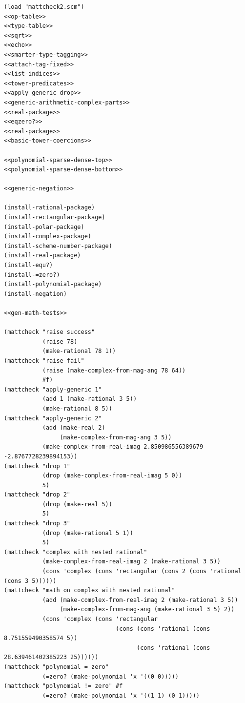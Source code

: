 \documentclass[final,fleqn,titlepage,twoside]{article}
\begin{document}
\begin{verbatim}
(load "mattcheck2.scm")
<<op-table>>
<<type-table>>
<<sqrt>>
<<echo>>
<<smarter-type-tagging>>
<<attach-tag-fixed>>
<<list-indices>>
<<tower-predicates>>
<<apply-generic-drop>>
<<generic-arithmetic-complex-parts>>
<<real-package>>
<<eqzero?>>
<<real-package>>
<<basic-tower-coercions>>

<<polynomial-sparse-dense-top>>
<<polynomial-sparse-dense-bottom>>

<<generic-negation>>

(install-rational-package)
(install-rectangular-package)
(install-polar-package)
(install-complex-package)
(install-scheme-number-package)
(install-real-package)
(install-equ?)
(install-=zero?)
(install-polynomial-package)
(install-negation)

<<gen-math-tests>>

(mattcheck "raise success"
           (raise 78)
           (make-rational 78 1))
(mattcheck "raise fail"
           (raise (make-complex-from-mag-ang 78 64))
           #f)
(mattcheck "apply-generic 1"
           (add 1 (make-rational 3 5))
           (make-rational 8 5))
(mattcheck "apply-generic 2"
           (add (make-real 2)
                (make-complex-from-mag-ang 3 5))
           (make-complex-from-real-imag 2.850986556389679 -2.8767728239894153))
(mattcheck "drop 1"
           (drop (make-complex-from-real-imag 5 0))
           5)
(mattcheck "drop 2"
           (drop (make-real 5))
           5)
(mattcheck "drop 3"
           (drop (make-rational 5 1))
           5)
(mattcheck "complex with nested rational"
           (make-complex-from-real-imag 2 (make-rational 3 5))
           (cons 'complex (cons 'rectangular (cons 2 (cons 'rational (cons 3 5))))))
(mattcheck "math on complex with nested rational"
           (add (make-complex-from-real-imag 2 (make-rational 3 5))
                (make-complex-from-mag-ang (make-rational 3 5) 2))
           (cons 'complex (cons 'rectangular
                                (cons (cons 'rational (cons 8.751559490358574 5))
                                      (cons 'rational (cons 28.639461402385223 25))))))
(mattcheck "polynomial = zero"
           (=zero? (make-polynomial 'x '((0 0)))))
(mattcheck "polynomial != zero" #f
           (=zero? (make-polynomial 'x '((1 1) (0 1)))))


\end{verbatim}
\end{document}
